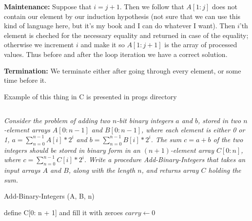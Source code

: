 \documentclass[11pt,oneside,titlepage]{book}
\begin{document}
\textbf{Maintenance: }
Suppose that $i = j + 1$. Then we follow that $A[1:j]$ does not contain our element by our
induction hypothesis (not sure that we can use this kind of language here, but it's
my book and I can do whatever I want). Then $i$'th element is cheched for the necessary
equality and returned in case of the equality; otherwise we increment $i$ and make it so
$A[1: j + 1]$ is the array of processed values. Thus before and after the loop iteration
we have a correct solution.

\textbf{Termination: }
We terminate either after going through every element, or some time before it.

Example of this thing in C is presented in progs directory


\subsection{}

\textit{Consider the problem of adding two $n$-bit binary integers $a$ and $b$, stored in
  two $n$-element arrays $A[0: n - 1]$ and $B[0: n - 1]$, where each element is either 0 or 1,
  $a = \sum_{n = 0}^{n - 1}A[i] * 2^i$ and $b = \sum_{n = 0}^{n - 1}B[i] * 2^i$. The
  sum $c = a + b$ of the two integers should be stored in binary form in an $(n + 1)$-element array
  $C[0:n]$, where   $c = \sum_{n = 0}^{n - 1}C[i] * 2^i$. Write a procedure Add-Binary-Integers
  that takes an input arrays $A$ and $B$, along with the length $n$, and returns array $C$ holding
  the sum.}


\begin{function}
  \caption{Add-Binary-Integers (A, B, n)}
  define C[0: n + 1] and fill it with zeroes\;
  $carry \leftarrow 0$\;
  \;

\end{function}
\end{document}

